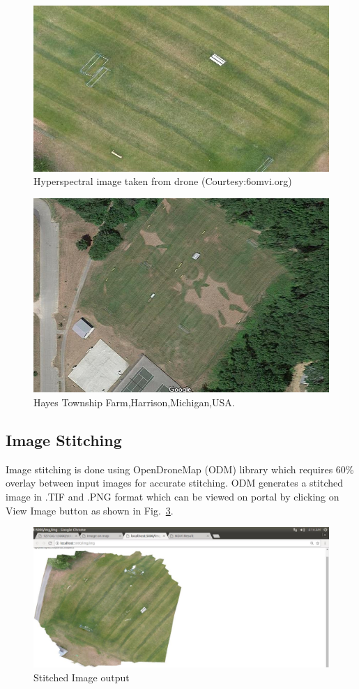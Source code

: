 \begin{figure}[!h]
	\includegraphics[width=0.5\linewidth]{fin_img_6}
	\centering
	\caption{\label{fig: hyp_3}Hyperspectral image taken from drone (Courtesy:6omvi.org)}
\end{figure}

\begin{figure}[h]
	\includegraphics[width=1.0\linewidth]{fin_img_7}
	\centering
	\caption{\label{fig: hyp_4}Hayes Township Farm,Harrison,Michigan,USA.}
\end{figure}

\subsection{Image Stitching}
Image stitching is done using OpenDroneMap (ODM) library which requires 60\% overlay between input images for accurate stitching. ODM generates a stitched image in .TIF and .PNG format which can be viewed on portal by clicking on View Image button as shown in Fig.~\ref{fig: res-3}.

\begin{figure}[h]
	\includegraphics[width=1\linewidth]{fin_img_17}
	\centering
	\caption{\label{fig: res-3}Stitched Image output}
\end{figure}

